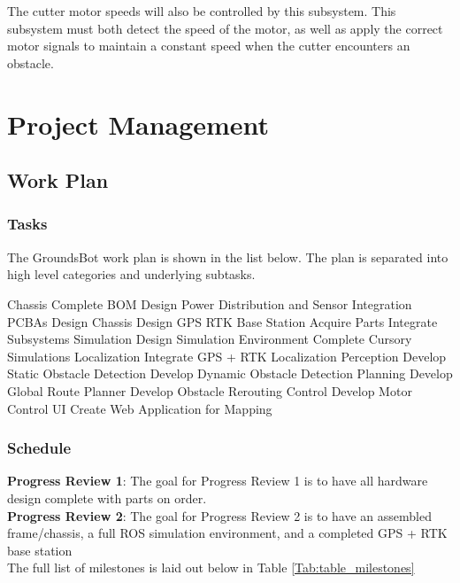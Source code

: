 \documentclass{article}
\begin{document}
			The cutter motor speeds will also be controlled by this subsystem. This subsystem must both detect the speed of the motor, as well as apply the correct motor signals to maintain a constant speed when the cutter encounters an obstacle. 


\section{Project Management}
\subsection{Work Plan}
\subsubsection{Tasks}
The GroundsBot work plan is shown in the list below.  The plan is separated into high level categories and underlying subtasks. \\
\begin{outline}[enumerate]
  \1 Chassis
    \2 Complete BOM
    \2 Design Power Distribution and Sensor Integration PCBAs
    \2 Design Chassis
    \2 Design GPS RTK Base Station
    \2 Acquire Parts
    \2 Integrate Subsystems
  \1 Simulation
    \2 Design Simulation Environment
    \2 Complete Cursory Simulations
  \1 Localization
    \2 Integrate GPS + RTK Localization
  \1 Perception
    \2 Develop Static Obstacle Detection
    \2 Develop Dynamic Obstacle Detection
  \1 Planning
    \2 Develop Global Route Planner
    \2 Develop Obstacle Rerouting
  \1 Control
    \2 Develop Motor Control
  \1 UI
    \2 Create Web Application for Mapping
\end{outline}

   
\subsubsection{Schedule}
\textbf{Progress Review 1}: The goal for Progress Review 1 is to have all hardware design complete with parts on order. \\
\textbf{Progress Review 2}: The goal for Progress Review 2 is to have an assembled frame/chassis, a full ROS simulation environment, and a completed GPS + RTK base station\\

The full list of milestones is laid out below in Table \ref{Tab:table_milestones}\\ 
\end{document}
